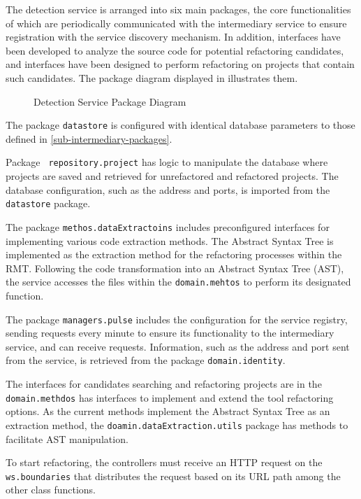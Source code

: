 The detection service is arranged into six main packages, the core functionalities of which are periodically communicated with the intermediary service to ensure registration with the service discovery mechanism. In addition, interfaces have been developed to analyze the source code for potential refactoring candidates, and interfaces have been designed to perform refactoring on projects that contain such candidates. The package diagram displayed in  illustrates them.
\begin{figure}[ht!]
\SetCaptionWidth{\textwidth}
\caption{Detection Service Package Diagram}
\label{fig-package-detection}
\fontsize{7.5}{9.5}\selectfont

\end{figure}
\FloatBarrier

The package \texttt{datastore} is configured with identical database parameters to those defined in \cref{sub-intermediary-packages}.

Package \texttt{ repository.project} has logic to manipulate the database where projects are saved and retrieved for unrefactored and refactored projects. The database configuration, such as the address and ports, is imported from the \texttt{datastore} package.

The package \texttt{methos.dataExtractoins} includes preconfigured interfaces for implementing various code extraction methods. The Abstract Syntax Tree is implemented as the extraction method for the refactoring processes within the RMT. Following the code transformation into an Abstract Syntax Tree (AST), the service accesses the files within the \texttt{domain.mehtos} to perform its designated function.

The package \texttt{managers.pulse} includes the configuration for the service registry, sending requests every minute to ensure its functionality to the intermediary service, and can receive requests. Information, such as the address and port sent from the service, is retrieved from the package \texttt{domain.identity}.

The interfaces for candidates searching and refactoring projects are in the \texttt{domain.methdos} has interfaces to implement and extend the tool refactoring options. As the current methods implement the Abstract Syntax Tree as an extraction method, the \texttt{doamin.dataExtraction.utils} package has methods to facilitate AST manipulation.

To start refactoring, the controllers must receive an HTTP request on the \texttt{ws.boundaries} that distributes the request based on its URL path among the other class functions. 

